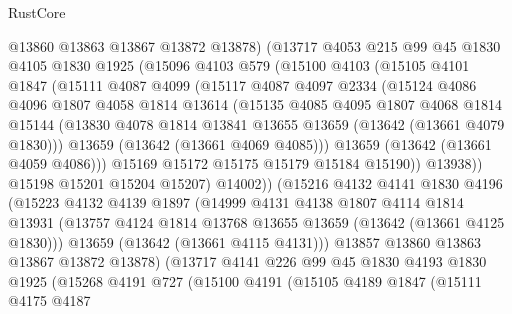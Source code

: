 \begin{lexlean}{RustCore}
\begin{coremodule}
            @13860
            @13863
            @13867
            @13872
            @13878)
          (@13717
            @4053
            @215
            @99
            @45
            @1830
            @4105
            @1830
            @1925
            (@15096
              @4103
              @579
              (@15100
                @4103
                (@15105
                  @4101
                  @1847
                  (@15111
                    @4087
                    @4099
                    (@15117
                      @4087
                      @4097
                      @2334
                      (@15124
                        @4086
                        @4096
                        @1807
                        @4058
                        @1814
                        @13614
                        (@15135
                          @4085
                          @4095
                          @1807
                          @4068
                          @1814
                          @15144
                          (@13830 @4078 @1814 @13841 @13655 @13659 (@13642 (@13661 @4079 @1830)))
                          @13659
                          (@13642 (@13661 @4069 @4085)))
                        @13659
                        (@13642 (@13661 @4059 @4086)))
                      @15169
                      @15172
                      @15175
                      @15179
                      @15184
                      @15190))
                  @13938))
              @15198
              @15201
              @15204
              @15207)
            @14002))
        (@15216
          @4132
          @4141
          @1830
          @4196
          (@15223
            @4132
            @4139
            @1897
            (@14999
              @4131
              @4138
              @1807
              @4114
              @1814
              @13931
              (@13757 @4124 @1814 @13768 @13655 @13659 (@13642 (@13661 @4125 @1830)))
              @13659
              (@13642 (@13661 @4115 @4131)))
            @13857
            @13860
            @13863
            @13867
            @13872
            @13878)
          (@13717
            @4141
            @226
            @99
            @45
            @1830
            @4193
            @1830
            @1925
            (@15268
              @4191
              @727
              (@15100
                @4191
                (@15105
                  @4189
                  @1847
                  (@15111
                    @4175
                    @4187

\end{coremodule}
\end{lexlean}
